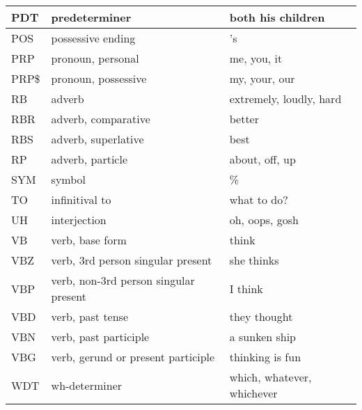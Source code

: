 \begin{table}[]
{\begin{tabular}{|l|l|l|}
            PDT          & predeterminer                             & both his children          \\ \hline
            POS          & possessive ending                         & 's                         \\ \hline
            PRP          & pronoun, personal                         & me, you, it                \\ \hline
            PRP\$        & pronoun, possessive                       & my, your, our              \\ \hline
            RB           & adverb                                    & extremely, loudly, hard    \\ \hline
            RBR          & adverb, comparative                       & better                     \\ \hline
            RBS          & adverb, superlative                       & best                       \\ \hline
            RP           & adverb, particle                          & about, off, up             \\ \hline
            SYM          & symbol                                    & \%                         \\ \hline
            TO           & infinitival to                            & what to do?                \\ \hline
            UH           & interjection                              & oh, oops, gosh             \\ \hline
            VB           & verb, base form                           & think                      \\ \hline
            VBZ          & verb, 3rd person singular present         & she thinks                 \\ \hline
            VBP          & verb, non-3rd person singular present     & I think                    \\ \hline
            VBD          & verb, past tense                          & they thought               \\ \hline
            VBN          & verb, past participle                     & a sunken ship              \\ \hline
            VBG          & verb, gerund or present participle        & thinking is fun            \\ \hline
            WDT          & wh-determiner                             & which, whatever, whichever \\ \hline

\end{tabular}}
\end{table}
